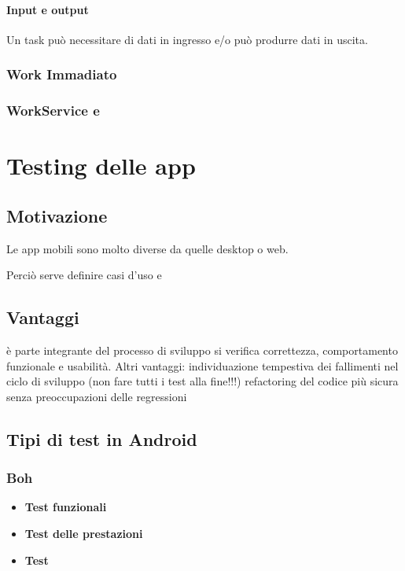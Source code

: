 \subsubsection{Input e output}
\par Un task può necessitare di dati in ingresso e/o può produrre dati in uscita.

\subsection{Work Immadiato}

\subsection{WorkService e }

\chapter{Testing delle app}
\section{Motivazione}
\par Le app mobili sono molto diverse da quelle desktop o web.
\par Perciò serve definire casi d'uso e 

\section{Vantaggi}
è parte integrante del processo di sviluppo
si verifica correttezza, comportamento funzionale e usabilità.
Altri vantaggi:
individuazione tempestiva dei fallimenti nel ciclo di sviluppo (non fare tutti i test alla fine!!!)
refactoring del codice più sicura senza preoccupazioni delle regressioni

\section{Tipi di test in Android}
\subsection{Boh}
\begin{itemize}
    \item \textbf{Test funzionali}
    \item \textbf{Test delle prestazioni}
    \item \textbf{Test}
\end{itemize}

